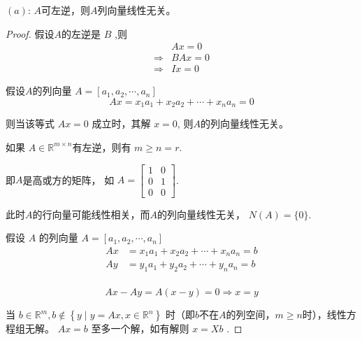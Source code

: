 \begin{theorem}
    $(a)$: $A$可左逆，则$A$列向量线性无关。
\end{theorem}

\begin{proof}
    假设$A$的左逆是 $ B $ ,则
    \begin{equation}
    \begin{aligned}
            & A x=0 \\
     \Rightarrow &B A x=0 \\
    \Rightarrow & I x=0
    \end{aligned}
    \end{equation}

    假设$A$的列向量 $ A=\left[a_{1}, a_{2}, \cdots, a_{n}\right] $
    \begin{equation}
    A x=x_{1} a_{1}+x_{2} a_{2}+\cdots+x_{n} a_{n}=0
    \end{equation}

    则当该等式 $ A x=0 $ 成立时，其解 $ x=0 $, 则$A$的列向量线性无关。  
    
    \begin{corollary}
        如果 $ A \in \mathbb{R}^{m \times n} $有左逆，则有 $ m \geq n = r $. 

    即$A$是高或方的矩阵， 如 $ A=\left[\begin{array}{ll}1 & 0 \\ 0 & 1 \\ 0 & 0\end{array}\right] $. 
    
    此时$A$的行向量可能线性相关，而$A$的列向量线性无关， $N(A) = \{0\}$.
    \end{corollary}
    

    假设 $ A $ 的列向量 $ A=\left[a_{1}, a_{2}, \cdots, a_{n}\right] $
    \begin{equation}
    \begin{aligned}
         A x&=x_{1} a_{1}+x_{2} a_{2}+\cdots+x_{n} a_{n}=b \\
    A y&=y_{1} a_{1}+y_{2} a_{2}+\cdots+y_{n} a_{n}=b \\
    \end{aligned}
    \end{equation}

    \begin{equation}A x-A y=A(x-y)=0 \Rightarrow x=y\end{equation}

    当 $ b \in \mathbb{R}^{m}, b \notin\left\{y \mid y=A x, x \in \mathbb{R}^{n}\right\} $ 时（即$b$不在$A$的列空间，$ m \geq n  $时），线性方程组无解。  $ A x=b $ 至多一个解，如有解则 $ x=X b $ . 
\end{proof}

